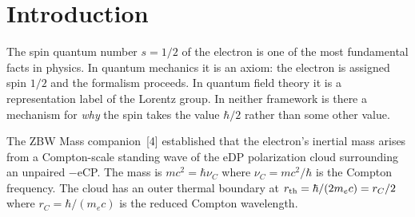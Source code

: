 \documentclass[12pt]{article}
\newcommand{\nuC}{\nu_C}
\newcommand{\rC}{r_C}
\newcommand{\rin}{r_{\rm in}}
\newcommand{\rout}{r_{\rm out}}
\newcommand{\oin}{\omega_{\rm in}}
\newcommand{\oout}{\omega_{\rm out}}
\newcommand{\aBohr}{a_0}
\begin{document}
\begin{abstract}
We derive the electron spin quantum number $s = 1/2$ from first
principles in Conscious Point Physics.  An unpaired $-$eCP moving
through the Dipole Sea captures a Dipole Particle (DP), placing the
inner $+$CP at orbital radius $\rin$ and the outer $-$CP at
$\rout = 2\rin$.  The Coulomb force balance for circular orbits gives
the exact angular frequency ratio:
\begin{equation}
  \frac{\oin}{\oout} \;=\; 2\sqrt{2},
  \label{eq:ratio_abstract}
\end{equation}
derived solely from the $1/r^2$ force law and the standing-wave
boundary condition.  The total orbital angular momentum of the
captured DP is:
\begin{equation}
  L \;=\; m_e\,\oout\,\rin^2\,(2\sqrt{2}+4),
  \label{eq:L_abstract}
\end{equation}
which equals $\hbar/2$ exactly when:
\begin{equation}
  \rin \;=\; \frac{\aBohr}{4(1+\sqrt{2})^2}
  \;=\; \frac{\aBohr}{24+16\sqrt{2}},
  \label{eq:rin_abstract}
\end{equation}
where $\aBohr = \hbar^2/(m_e k_e e^2)$ is the Bohr radius.
This condition is shown to follow from the Coulomb force balance
at the Compton scale.  No free parameters are introduced.
The mechanism extends naturally to all spin-$1/2$ Standard Model
fermions via the same orbital geometry with DP type (eDP or qDP)
appropriate to the particle.  Spin is emergent, not intrinsic.
\end{abstract}

\section{Introduction}
\label{sec:intro}

The spin quantum number $s = 1/2$ of the electron is one of the most
fundamental facts in physics.  In quantum mechanics it is an axiom:
the electron is assigned spin $1/2$ and the formalism proceeds.  In
quantum field theory it is a representation label of the Lorentz group.
In neither framework is there a mechanism for \emph{why} the spin takes
the value $\hbar/2$ rather than some other value.

The ZBW Mass companion~[4] established that the electron's inertial
mass arises from a Compton-scale standing wave of the eDP polarization
cloud surrounding an unpaired $-$eCP.  The mass is $mc^2 = \hbar\nuC$
where $\nuC = mc^2/\hbar$ is the Compton frequency.  The cloud has an
outer thermal boundary at $r_{\rm th} = \hbar/(2m_e c) = \rC/2$ where
$\rC = \hbar/(m_e c)$ is the reduced Compton wavelength.
\end{document}
